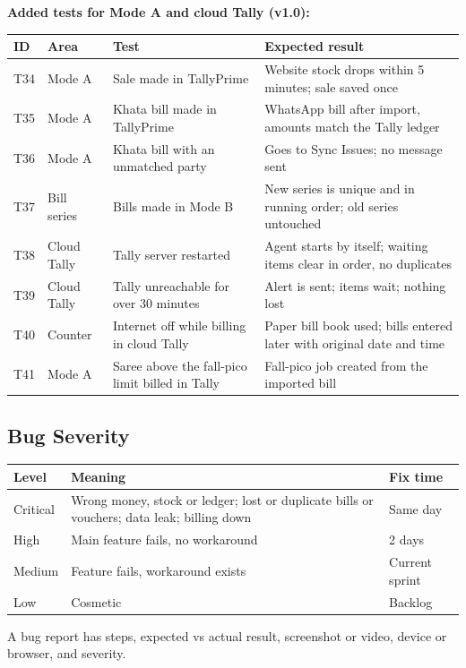 \documentclass[11pt,a4paper]{article}
\newcommand{\hdr}{\rowcolor{hdrgray}\bfseries}
\begin{document}
\textbf{Added tests for Mode A and cloud Tally (v1.0):}
{\small
\begin{longtable}{L{1cm}L{2cm}L{6cm}L{7.5cm}}
\hdr ID & Area & Test & Expected result \\ \endhead
T34 & Mode A & Sale made in TallyPrime & Website stock drops within 5 minutes; sale saved once \\
T35 & Mode A & Khata bill made in TallyPrime & WhatsApp bill after import, amounts match the Tally ledger \\
T36 & Mode A & Khata bill with an unmatched party & Goes to Sync Issues; no message sent \\
T37 & Bill series & Bills made in Mode B & New series is unique and in running order; old series untouched \\
T38 & Cloud Tally & Tally server restarted & Agent starts by itself; waiting items clear in order, no duplicates \\
T39 & Cloud Tally & Tally unreachable for over 30 minutes & Alert is sent; items wait; nothing lost \\
T40 & Counter & Internet off while billing in cloud Tally & Paper bill book used; bills entered later with original date and time \\
T41 & Mode A & Saree above the fall-pico limit billed in Tally & Fall-pico job created from the imported bill \\
\end{longtable}
}

\subsection{Bug Severity}
\begin{longtable}{L{2cm}L{10cm}L{4.5cm}}
\hdr Level & Meaning & Fix time \\ \endhead
Critical & Wrong money, stock or ledger; lost or duplicate bills or vouchers; data leak; billing down & Same day \\
High & Main feature fails, no workaround & 2 days \\
Medium & Feature fails, workaround exists & Current sprint \\
Low & Cosmetic & Backlog \\
\end{longtable}
A bug report has steps, expected vs actual result, screenshot or video, device or browser, and severity.
\end{document}
